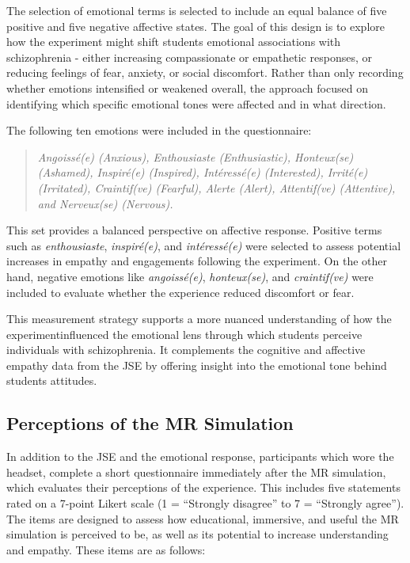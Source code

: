 \vspace{1em}

The selection of emotional terms is selected to include an equal balance of five positive and five negative affective states. The goal of this design is to explore how the experiment might shift students emotional associations with schizophrenia - either increasing compassionate or empathetic responses, or reducing feelings of fear, anxiety, or social discomfort. Rather than only recording whether emotions intensified or weakened overall, the approach focused on identifying which specific emotional tones were affected and in what direction.

The following ten emotions were included in the questionnaire:

\begin{quote}
\textit{Angoissé(e) (Anxious), Enthousiaste (Enthusiastic), Honteux(se) (Ashamed), Inspiré(e) (Inspired), Intéressé(e) (Interested), Irrité(e) (Irritated), Craintif(ve) (Fearful), Alerte (Alert), Attentif(ve) (Attentive), and Nerveux(se) (Nervous).}
\end{quote}

This set provides a balanced perspective on affective response. Positive terms such as \textit{enthousiaste}, \textit{inspiré(e)}, and \textit{intéressé(e)} were selected to assess potential increases in empathy and engagements following the experiment. On the other hand, negative emotions like \textit{angoissé(e)}, \textit{honteux(se)}, and \textit{craintif(ve)} were included to evaluate whether the experience reduced discomfort or fear.

\vspace{1em}

This measurement strategy supports a more nuanced understanding of how the experimentinfluenced the emotional lens through which students perceive individuals with schizophrenia. It complements the cognitive and affective empathy data from the JSE by offering insight into the emotional tone behind students attitudes.

\subsection{Perceptions of the MR Simulation}

In addition to the JSE and the emotional response, participants which wore the headset, complete a short questionnaire immediately after the MR simulation, which evaluates their perceptions of the experience. This includes five statements rated on a 7-point Likert scale (1 = “Strongly disagree” to 7 = “Strongly agree”). The items are designed to assess how educational, immersive, and useful the MR simulation is perceived to be, as well as its potential to increase understanding and empathy. These items are as follows:


